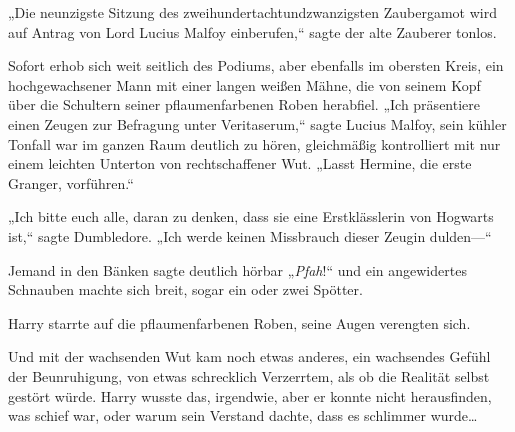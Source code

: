 „Die neunzigste Sitzung des zweihundertachtundzwanzigsten Zaubergamot wird auf Antrag von Lord Lucius Malfoy einberufen,“ sagte der alte Zauberer tonlos.

Sofort erhob sich weit seitlich des Podiums, aber ebenfalls im obersten Kreis, ein hochgewachsener Mann mit einer langen weißen Mähne, die von seinem Kopf über die Schultern seiner pflaumenfarbenen Roben herabfiel.
„Ich präsentiere einen Zeugen zur Befragung unter Veritaserum,“ sagte Lucius Malfoy, sein kühler Tonfall war im ganzen Raum deutlich zu hören, gleichmäßig kontrolliert mit nur einem leichten Unterton von rechtschaffener Wut. „Lasst Hermine, die erste Granger, vorführen.“

„Ich bitte euch alle, daran zu denken, dass sie eine Erstklässlerin von Hogwarts ist,“ sagte Dumbledore. „Ich werde keinen Missbrauch dieser Zeugin dulden—“

Jemand in den Bänken sagte deutlich hörbar „\emph{Pfah}!“ und ein angewidertes Schnauben machte sich breit, sogar ein oder zwei Spötter.

Harry starrte auf die pflaumenfarbenen Roben, seine Augen verengten sich.

Und mit der wachsenden Wut kam noch etwas anderes, ein wachsendes Gefühl der Beunruhigung, von etwas schrecklich Verzerrtem, als ob die Realität selbst gestört würde. Harry wusste das, irgendwie, aber er konnte nicht herausfinden, was schief war, oder warum sein Verstand dachte, dass es schlimmer wurde…

